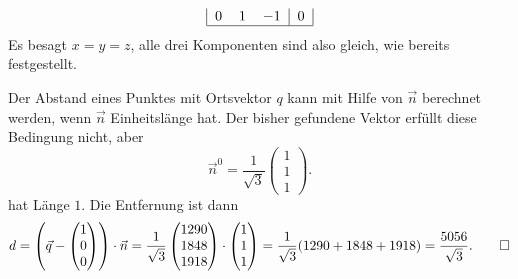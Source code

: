 \begin{loesung}
\begin{teilaufgaben}
\[\begin{tabular}{|ccc|c|}
0& 1&$-1$&0\\
\hline
\end{tabular}
\]
Es besagt $x=y=z$, alle drei Komponenten sind also gleich,
wie bereits festgestellt.
\item Der Abstand eines Punktes mit Ortsvektor $q$ kann mit Hilfe von
$\vec n$ berechnet werden, wenn $\vec n$ Einheitslänge hat. Der bisher
gefundene Vektor erfüllt diese Bedingung nicht, aber
\[
\vec n^0=\frac1{\sqrt{3}}\begin{pmatrix}1\\1\\1\end{pmatrix}.
\]
hat Länge $1$.
Die Entfernung ist dann
\[
d=\left(\vec q- \begin{pmatrix}1\\0\\0\end{pmatrix}\right)\cdot\vec n
=
\frac1{\sqrt{3}}\begin{pmatrix}1290\\1848\\1918\end{pmatrix}
\cdot
\begin{pmatrix}1\\1\\1\end{pmatrix}
=\frac1{\sqrt{3}}(1290+1848+1918)=\frac{5056}{\sqrt{3}}.
\qedhere
\]
\end{teilaufgaben}
\end{loesung}

